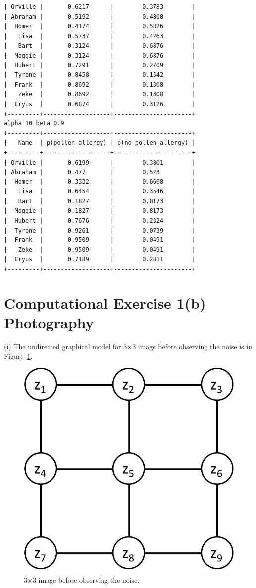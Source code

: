 \documentclass{article}
\begin{document}
\begin{lstlisting}
| Orville |       0.6217      |        0.3783        |
| Abraham |       0.5192      |        0.4808        |
|  Homer  |       0.4174      |        0.5826        |
|   Lisa  |       0.5737      |        0.4263        |
|   Bart  |       0.3124      |        0.6876        |
|  Maggie |       0.3124      |        0.6876        |
|  Hubert |       0.7291      |        0.2709        |
|  Tyrone |       0.8458      |        0.1542        |
|  Frank  |       0.8692      |        0.1308        |
|   Zeke  |       0.8692      |        0.1308        |
|  Cryus  |       0.6874      |        0.3126        |
+---------+-------------------+----------------------+
alpha 10 beta 0.9
+---------+-------------------+----------------------+
|   Name  | p(pollen allergy) | p(no pollen allergy) |
+---------+-------------------+----------------------+
| Orville |       0.6199      |        0.3801        |
| Abraham |       0.477       |        0.523         |
|  Homer  |       0.3332      |        0.6668        |
|   Lisa  |       0.6454      |        0.3546        |
|   Bart  |       0.1827      |        0.8173        |
|  Maggie |       0.1827      |        0.8173        |
|  Hubert |       0.7676      |        0.2324        |
|  Tyrone |       0.9261      |        0.0739        |
|  Frank  |       0.9509      |        0.0491        |
|   Zeke  |       0.9509      |        0.0491        |
|  Cryus  |       0.7189      |        0.2811        |
+---------+-------------------+----------------------+
\end{lstlisting}
\pagebreak

\section*{Computational Exercise 1(b) Photography}
(i) The undirected graphical model for 3$\times$3 image before observing the noise is in Figure~\ref{f:c1bi}.
\begin{figure}[h]
  \centering
  \includegraphics[width=0.2\columnwidth]{c1bi.pdf}
    \vspace{-0.1cm}
  \caption{3$\times$3 image before observing the noise.}
  \label{f:c1bi}
\end{figure}
\end{document}
